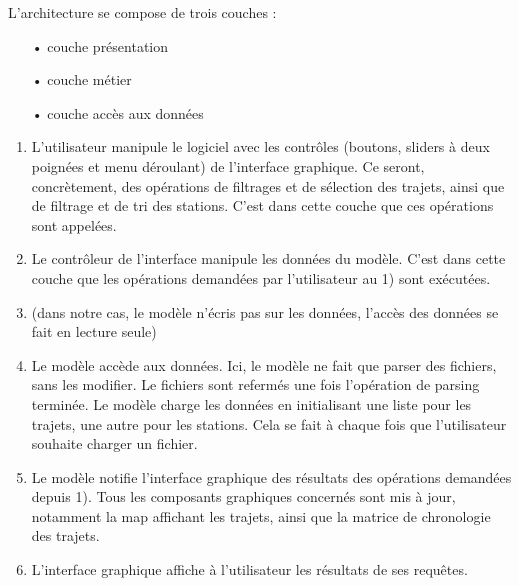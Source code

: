 \documentclass[12pt]{article}
\begin{document}
		L’architecture se compose de trois couches :
		\begin{itemize}
			\item[•]couche présentation
			\item[•]couche métier 
			\item[•]couche accès aux données\\
		\end{itemize}
			
		\begin{enumerate}
		\item L'utilisateur manipule le logiciel avec les contrôles (boutons, sliders à deux
		poignées et menu déroulant) de l’interface graphique. Ce seront, concrètement,
		des opérations de filtrages et de sélection des trajets, ainsi que de filtrage
		et de tri des stations. C’est dans cette couche que ces opérations sont appelées.\\
		
		\item Le contrôleur de l’interface manipule les données du modèle. C’est dans cette
		couche que les opérations demandées par l’utilisateur au 1) sont exécutées.\\
		
		\item (dans notre cas, le modèle n’écris pas sur les données, l’accès des données se
		fait en lecture seule)\\
		
		\item Le modèle accède aux données. Ici, le modèle ne fait que parser des fichiers,
		sans les modifier. Le fichiers sont refermés une fois l’opération de parsing
		terminée. Le modèle charge les données en initialisant une liste pour les trajets,
		une autre pour les stations. Cela se fait à chaque fois que l’utilisateur
		souhaite charger un fichier.\\
		
		\item Le modèle notifie l’interface graphique des résultats des opérations demandées
		depuis 1). Tous les composants graphiques concernés sont mis à jour, notamment la
		map affichant les trajets, ainsi que la matrice de chronologie des trajets.\\
		
		\item L’interface graphique affiche à l'utilisateur les résultats de ses requêtes.\\
		\end{enumerate}
\end{document}

